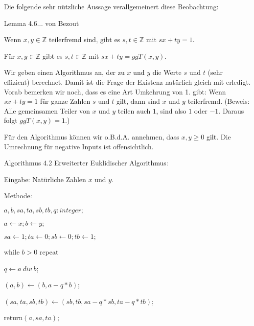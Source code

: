 \documentclass[a4paper]{article}
\begin{document}
\begin{multicols}{3}
    Die folgende sehr nützliche Aussage verallgemeinert diese Beobachtung:

    Lemma 4.6... von Bezout
    \begin{enumerate*}
        \item Wenn $x,y\in\mathbb{Z}$ teilerfremd sind, gibt es $s,t\in\mathbb{Z}$ mit $sx+ty= 1$.
        \item  Für $x,y\in\mathbb{Z}$ gibt es $s,t\in\mathbb{Z}$ mit $sx+ty= ggT(x,y)$.
    \end{enumerate*}

    Wir geben einen Algorithmus an, der zu $x$ und $y$ die Werte $s$ und $t$ (sehr effizient) berechnet. Damit ist die Frage der Existenz natürlich gleich mit erledigt. Vorab bemerken wir noch, dass es eine Art Umkehrung von 1. gibt: Wenn $sx+ty= 1$ für ganze Zahlen $s$ und $t$ gilt, dann sind $x$ und $y$ teilerfremd. (Beweis: Alle gemeinsamen Teiler von $x$ und $y$ teilen auch $1$, sind also $1$ oder $-1$. Daraus folgt $ggT(x,y) = 1$.)

    Für den Algorithmus können wir o.B.d.A. annehmen, dass $x,y\geq 0$ gilt. Die Umrechnung für negative Inputs ist offensichtlich.

    Algorithmus 4.2 Erweiterter Euklidischer Algorithmus:
    \begin{itemize*}
        \item Eingabe: Natürliche Zahlen $x$ und $y$.
        \item Methode:
        \begin{enumerate*}
            \item $a,b,sa,ta,sb,tb,q:integer;$
            \item  $a\leftarrow x; b\leftarrow y;$
            \item  $sa\leftarrow 1; ta\leftarrow 0; sb\leftarrow 0; tb\leftarrow 1;$
            \item  while $b> 0$ repeat
            \begin{enumerate*}
                \item $q\leftarrow a\ div\ b$;
                \item  $(a,b)\leftarrow (b,a-q*b)$;
                \item  $(sa,ta,sb,tb)\leftarrow (sb,tb,sa-q*sb,ta-q*tb)$;
            \end{enumerate*}
            \item  return$(a,sa,ta)$;
        \end{enumerate*}
    \end{itemize*}


\end{multicols}
\end{document}
